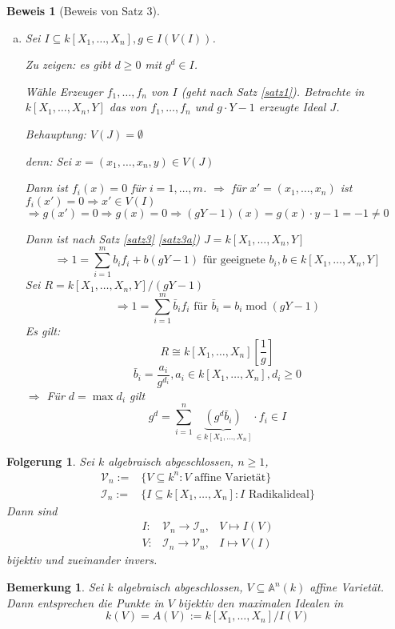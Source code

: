 \documentclass[a4paper, 12pt, numbers=noendperiod, chapterprefix=true]{scrbook}
\theoremstyle{break}
\newtheorem{Bem}[Def]{Bemerkung}
\newtheorem{Folg}[Def]{Folgerung}
\theoremstyle{nonumberbreak}
\newtheorem{Bew}{Beweis}
\theoremstyle{nonumberplain}
\DeclareMathOperator{\modmodulo}{mod}%
\newcommand{\A}{\mathbb{A}}
\newcommand{\calI}{\mathcal{I}}
\newcommand{\calV}{\mathcal{V}}
\begin{document}
\begin{Bew}[Beweis von Satz 3]
\begin{enumerate}[a)]
\item
Sei $I\subseteq k[X_1,\dots ,X_n], g\in I(V(I))$.

\emph{Zu zeigen:}  es gibt $d\geq 0$ mit $g^d\in I$.

W\"ahle Erzeuger $f_1,\dots , f_n$ von $I$ (geht nach Satz \ref{satz1}). Betrachte in $k[X_1,\dots ,X_n,Y]$ das von $f_1,\dots ,f_n$ und $g\cdot Y-1$ erzeugte Ideal $J$.

\emph{Behauptung:} $V(J) = \emptyset$

\emph{denn:} Sei $x= (x_1,\dots ,x_n, y) \in V(J)$

Dann ist $f_i(x)= 0$ f\"ur $i=1,\dots ,m$. $\Rightarrow $ f\"ur $x'=(x_1,\dots ,x_n)$ ist $f_i(x')=0 \Rightarrow x'\in V(I)$ $\Rightarrow g(x')=0 \Rightarrow g(x)=0\Rightarrow (gY-1)(x)=g(x)\cdot y-1 = -1 \not=0$

Dann ist nach Satz \ref{satz3} \ref{satz3a}) $J=k[X_1,\dots ,X_n,Y]$
	\[\Rightarrow 1= \sum_{i=1}^m b_i f_i + b(gY-1) \textrm{ f\"ur geeignete }b_i, b\in k[X_1,\dots ,X_n,Y]\]
Sei $R =k[X_1,\dots ,X_n,Y]/(gY-1)$
	\[\Rightarrow 1=\sum_{i=1}^m \bar{b}_if_i \textrm{ f\"ur }\bar{b}_i = b_i \modmodulo(gY-1)\]
\emph{Es gilt:} \[R\cong k[X_1,\dots ,X_n][\frac{1}{g}]\]
	\[\bar b_i= \frac{a_i}{g^{d_i}}, a_i\in k[X_1,\dots ,X_n], d_i \geq0\]
$\Rightarrow$ F\"ur $d= \max d_i$ gilt
	\[g^d = \sum_{i=1}^n \underbrace{\left( g^d \bar b_i \right)}_{\in k[X_1,\dots ,X_n]} \cdot f_i \in I\]
\end{enumerate}\end{Bew}

\begin{Folg}
Sei $k$ algebraisch abgeschlossen, $n\geq 1$,
	\[\begin{array}{rl}\calV_n := & \{V\subseteq k^n : V \textrm{ affine Variet\"at}\}\\
	\calI_n := & \{ I\subseteq k[X_1,\dots ,X_n] : I \textrm{ Radikalideal}\} \end{array}\]
Dann sind \[\begin{array}{rll}
	I: & \calV_n \to \calI_n, & V \mapsto I(V)\\
	V: & \calI_n \to \calV_n, & I \mapsto V(I)\end{array}\]
bijektiv und zueinander invers.
\end{Folg}

\begin{Bem}
Sei $k$ algebraisch abgeschlossen, $V\subseteq \A ^n(k)$ affine Variet\"at. Dann entsprechen die Punkte in $V$ bijektiv den maximalen Idealen in
	\[ k(V) =A(V):= k[X_1,\dots ,X_n]/I(V) \]
\end{Bem}
\end{document}

